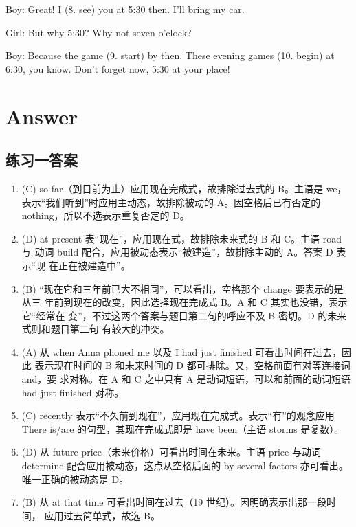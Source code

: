 Boy: Great! I \ttu (8. see) you at 5:30 then. I'll bring my car.

Girl: But why 5:30? Why not seven o'clock?

Boy: Because the game \ttu (9. start) by then. These evening games \ttu (10.
begin) at 6:30, you know. Don't forget now, 5:30 at your place!

\section{Answer}

\subsection{练习一答案}

\begin{enumerate}
\item (C) so far（到目前为止）应用现在完成式，故排除过去式的 B。主语是 we，表示“我们听到”时应用主动态，故排除被动的 A。因空格后已有否定的 nothing，所以不选表示重复否定的 D。

\item (D) at present 表“现在”，应用现在式，故排除未来式的 B 和 C。主语 road 与
  动词 build 配合，应用被动态表示“被建造”，故排除主动的 A。答案 D 表示“现
  在正在被建造中”。

\item (B) “现在它和三年前已大不相同”，可以看出，空格那个 change 要表示的是从三
  年前到现在的改变，因此选择现在完成式 B。A 和 C 其实也没错，表示它“经常在
  变”，不过这两个答案与题目第二句的呼应不及 B 密切。D 的未来式则和题目第二句
  有较大的冲突。

\item (A) 从 when Anna phoned me 以及 I had just finished 可看出时间在过去，因此
  表示现在时间的 B 和未来时间的 D 都可排除。又，空格前面有对等连接词 and，要
  求对称。在 A 和 C 之中只有 A 是动词短语，可以和前面的动词短语 had just
  finished 对称。

\item (C) recently 表示“不久前到现在”，应用现在完成式。表示“有”的观念应用 There is/are 的句型，其现在完成式即是 have been（主语 storms 是复数）。

\item (D) 从 future price（未来价格）可看出时间在未来。主语 price 与动词 determine 配合应用被动态，这点从空格后面的 by several factors 亦可看出。唯一正确的被动态是 D。

\item (B) 从 at that time 可看出时间在过去（19 世纪）。因明确表示出那一段时间，
  应用过去简单式，故选 B。


\end{enumerate}
